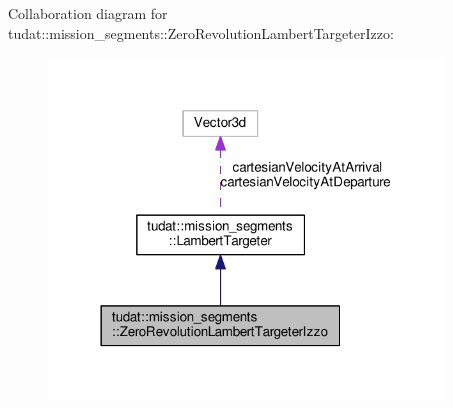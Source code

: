 Collaboration diagram for tudat\+:\+:mission\+\_\+segments\+:\+:Zero\+Revolution\+Lambert\+Targeter\+Izzo\+:
\nopagebreak
\begin{figure}[H]
\begin{center}
\leavevmode
\includegraphics[width=298pt]{classtudat_1_1mission__segments_1_1ZeroRevolutionLambertTargeterIzzo__coll__graph}
\end{center}
\end{figure}
